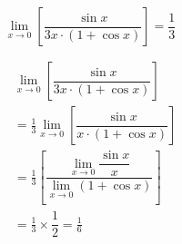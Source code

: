 \documentclass[14pt,fleqn]{extarticle}
\begin{document}
 

\begin{snippet}
    
    \incorrect

\[ \lim_{x\to 0} \left[ \dfrac{\sin x}{3 x\cdot(1+\cos x) }\right] = \frac{1}{3}\]    
    \reason

\begin{align}
&\lim_{x\to 0} \left[ \dfrac{\sin x}{3 x\cdot(1+\cos x) }\right]  \\
&= \frac{1}{3}\lim_{x\to 0} \left[ \dfrac{\sin x}{x\cdot (1+\cos x)}\right]  \\
&= \frac{1}{3} \left[ \dfrac{\lim_{x\to 0}\dfrac{\sin x}{x}}{\lim_{x\to 0}(1+\cos x)}\right]  \\
&= \frac{1}{3}\times \dfrac{1}{2} = \frac{1}{6}
\end{align}
    
\end{snippet} 
\end{document}
